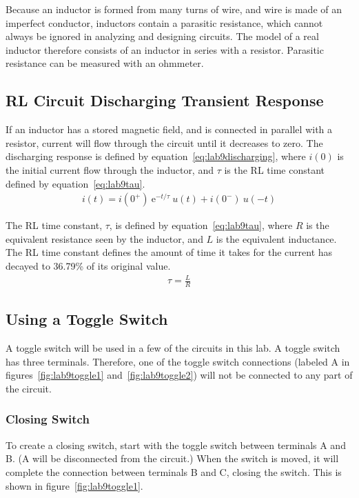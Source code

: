 Because an inductor is formed from many turns of wire, and wire is made of an imperfect conductor, inductors contain a parasitic resistance, which cannot always be ignored in analyzing and designing circuits. The model of a real inductor therefore consists of an inductor in series with a resistor. Parasitic resistance can be measured with an ohmmeter.

\subsection{RL Circuit Discharging Transient Response}
If an inductor has a stored magnetic field, and is connected in parallel with a resistor, current will flow through the circuit until it decreases to zero. The discharging response is defined by equation~\ref{eq:lab9discharging}, where $i(0)$ is the initial current flow through the inductor, and $\tau$ is the RL time constant defined by equation~\ref{eq:lab9tau}.
\begin{gather}
	i(t) = i(0^+)~\textrm{e}^{-t/\tau}~u(t) + i(0^-)~u(-t)
	\label{eq:lab9discharging}
\end{gather}

The RL time constant, $\tau$, is defined by equation~\ref{eq:lab9tau}, where $R$ is the equivalent resistance seen by the inductor, and $L$ is the equivalent inductance. The RL time constant defines the amount of time it takes for the current has decayed to 36.79\% of its original value.
\begin{gather}
	\tau = \frac{L}{R}
	\label{eq:lab9tau}
\end{gather}

\subsection{Using a Toggle Switch}

A toggle switch will be used in a few of the circuits in this lab. A toggle switch has three terminals. Therefore, one of the toggle switch connections (labeled A in figures~\ref{fig:lab9toggle1} and~\ref{fig:lab9toggle2}) will not be connected to any part of the circuit.

\subsubsection{Closing Switch}

To create a closing switch, start with the toggle switch between terminals A and B. (A will be disconnected from the circuit.) When the switch is moved, it will complete the connection between terminals B and C, closing the switch. This is shown in figure~\ref{fig:lab9toggle1}.

